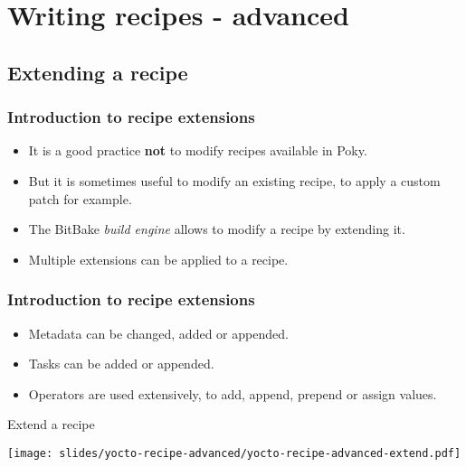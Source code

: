 \section{Writing recipes - advanced}

\subsection{Extending a recipe}

\begin{frame}
  \frametitle{Introduction to recipe extensions}
  \begin{itemize}
    \item It is a good practice {\bf not} to modify recipes available
          in Poky.
    \item But it is sometimes useful to modify an existing recipe, to
          apply a custom patch for example.
    \item The BitBake \emph{build engine} allows to modify a recipe by
          extending it.
    \item Multiple extensions can be applied to a recipe.
  \end{itemize}
\end{frame}

\begin{frame}
  \frametitle{Introduction to recipe extensions}
  \begin{itemize}
    \item Metadata can be changed, added or appended.
    \item Tasks can be added or appended.
    \item Operators are used extensively, to add, append, prepend or
          assign values.
  \end{itemize}
\end{frame}

\begin{frame}{Extend a recipe}
  \begin{center}
    \texttt{[image: slides/yocto-recipe-advanced/yocto-recipe-advanced-extend.pdf]}
  \end{center}
\end{frame}

